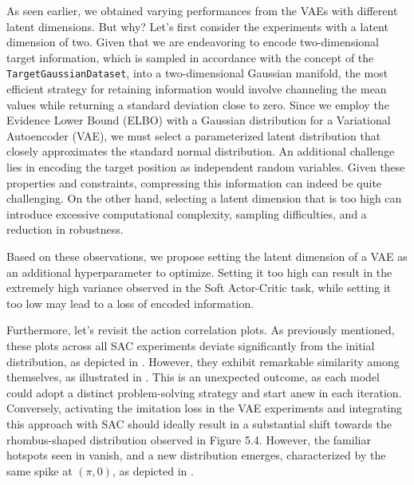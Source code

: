 As seen earlier, we obtained varying performances from the VAEs with different latent dimensions. But why? Let's first consider the experiments with a latent dimension of two. Given that we are endeavoring to encode two-dimensional target information, which is sampled in accordance with the concept of the \texttt{TargetGaussianDataset}, into a two-dimensional Gaussian manifold, the most efficient strategy for retaining information would involve channeling the mean values while returning a standard deviation close to zero. Since we employ the Evidence Lower Bound (ELBO) with a Gaussian distribution for a Variational Autoencoder (VAE), we must select a parameterized latent distribution that closely approximates the standard normal distribution. An additional challenge lies in encoding the target position as independent random variables. Given these properties and constraints, compressing this information can indeed be quite challenging. On the other hand, selecting a latent dimension that is too high can introduce excessive computational complexity, sampling difficulties, and a reduction in robustness.

Based on these observations, we propose setting the latent dimension of a VAE as an additional hyperparameter to optimize. Setting it too high can result in the extremely high variance observed in the Soft Actor-Critic task, while setting it too low may lead to a loss of encoded information.

Furthermore, let's revisit the action correlation plots. As previously mentioned, these plots across all SAC experiments deviate significantly from the initial distribution, as depicted in . However, they exhibit remarkable similarity among themselves, as illustrated in . This is an unexpected outcome, as each model could adopt a distinct problem-solving strategy and start anew in each iteration. Conversely, activating the imitation loss in the VAE experiments and integrating this approach with SAC should ideally result in a substantial shift towards the rhombus-shaped distribution observed in Figure 5.4. However, the familiar hotspots seen in  vanish, and a new distribution emerges, characterized by the same spike at $(\pi, 0)$, as depicted in .

